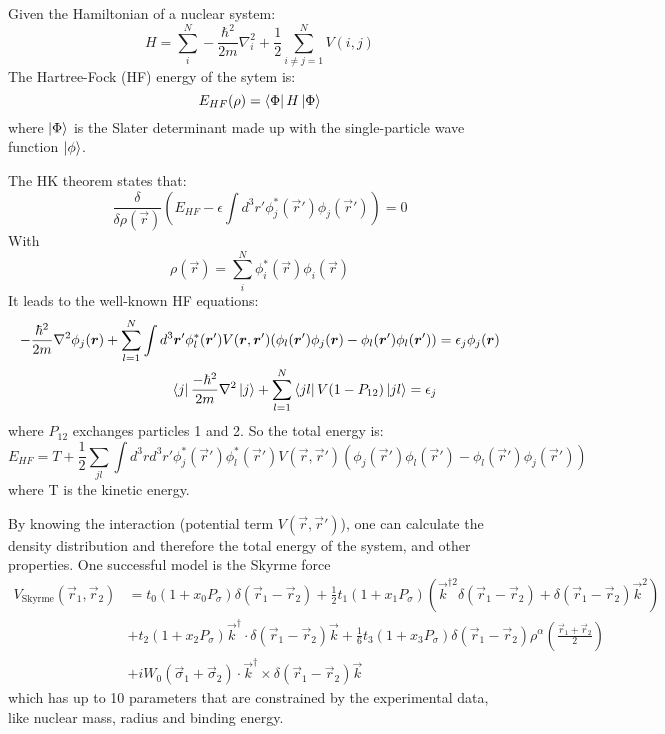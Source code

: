 Given the Hamiltonian of a nuclear system:
\begin{equation}
    H = \sum_i^N -\frac{\hbar^2}{2m}\nabla_i^2 + \frac{1}{2} \sum_{i\neq j=1}^N V(i, j)
\end{equation}
The Hartree-Fock (HF) energy of the sytem is:
\begin{equation}
    E_{HF}(\rho) = \bra{\Phi} H \ket{\Phi}
\end{equation}
where $\ket{\Phi}$ is the Slater determinant made up with the single-particle wave 
function $\ket{\phi}$.

The HK theorem states that:
\begin{equation}
    \frac{\delta}{\delta\rho(\vec{r})} \left( E_{HF} - \epsilon\int d^3r' \phi^*_j(\vec{r}')\phi_j(\vec{r}') \right) = 0
\end{equation}
With
\begin{equation}
    \rho(\vec{r}) = \sum_i^N \phi_i^*(\vec{r})\phi_i(\vec{r})
\end{equation}
It leads to the well-known HF equations:
\begin{equation}
    \begin{aligned}
	-\frac{\hbar^2}{2m}\nabla^2\phi_j(\boldsymbol{r}) 
	+ \sum_{l=1}^N \int d^3\boldsymbol{r}' \phi^*_l(\boldsymbol{r}') V(\boldsymbol{r}, \boldsymbol{r}') (\phi_l(\boldsymbol{r}')\phi_j(\boldsymbol{r}) - \phi_l(\boldsymbol{r}')\phi_l(\boldsymbol{r}'))
	&= \epsilon_j\phi_j(\boldsymbol{r})	\\
	\bra{j}\frac{-\hbar^2}{2m}\nabla^2\ket{j} + \sum_{l=1}^N \bra{jl}V(1-P_{12})\ket{jl} = \epsilon_j
    \end{aligned}
\end{equation}
where $P_{12}$ exchanges particles 1 and 2. So the total energy is:
\begin{equation}
    E_{HF} = T + \frac{1}{2}\sum_{jl} \int d^3r d^3r' \phi_j^*(\vec{r}')\phi_l^*(\vec{r}')V(\vec{r}, \vec{r}') (\phi_j(\vec{r}')\phi_l(\vec{r}') - \phi_l(\vec{r}')\phi_j(\vec{r}'))
\end{equation}
where T is the kinetic energy.

By knowing the interaction (potential term $V(\vec{r}, \vec{r}')$), 
one can calculate the density distribution and therefore the total 
energy of the system, and other properties. One successful model is the Skyrme force
\begin{equation}
    \begin{aligned}
	V_{\text{Skyrme}}(\vec{r}_1, \vec{r}_2) &= t_0 (1 + x_0 P_\sigma)\delta(\vec{r}_1 - \vec{r}_2) 
	+ \frac{1}{2}t_1 (1 + x_1 P_\sigma) \left( \vec{k}^{\dag2}\delta(\vec{r}_1 - \vec{r}_2) + \delta(\vec{r}_1 - \vec{r}_2)\vec{k}^2 \right)    \\
	&+ t_2(1 + x_2 P_\sigma)\vec{k}^\dag \cdot \delta(\vec{r}_1 
	    - \vec{r}_2)\vec{k} + \frac{1}{6} t_3 (1 + x_3 P_\sigma)\delta(\vec{r}_1 - \vec{r}_2) \rho^\alpha\left( \frac{\vec{r}_1 + \vec{r}_2}{2} \right) \\
	&+ iW_0 (\vec{\sigma}_1 + \vec{\sigma}_2) \cdot \vec{k}^\dag \times \delta(\vec{r}_1 - \vec{r}_2) \vec{k}
    \end{aligned}
\end{equation}
which has up to 10 parameters that are constrained by the experimental data, like
nuclear mass, radius and binding energy.

